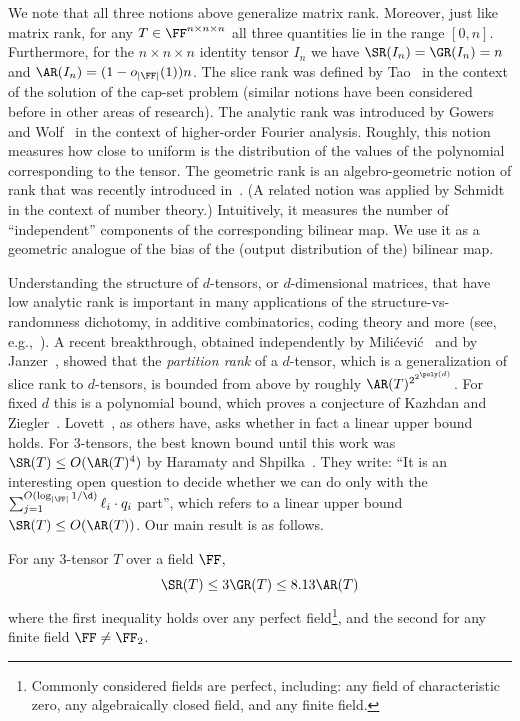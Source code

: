We note that all three notions above generalize matrix rank. Moreover, just like matrix rank, for any $T \in \FF^{n \times n \times n}$ all three quantities lie in the range $[0,n]$. Furthermore, for the $n \times n \times n$ identity tensor $I_n$ we have $\SR(I_n)=\GR(I_n)=n$ and $\AR(I_n)=(1-o_{|\FF|}(1))n$.
The slice rank was defined by Tao~\cite{Tao16} in the context of the solution of the cap-set problem (similar notions have been considered before in other areas of research). 
The analytic rank was introduced by Gowers and Wolf~\cite{GowersWo11} in the context of higher-order Fourier analysis.
Roughly, this notion measures how close to uniform is the distribution of the values of the polynomial corresponding to the tensor.
The geometric rank is an algebro-geometric notion of rank that was recently introduced in~\cite{KoppartyMoZu20}. 
(A related notion was applied by Schmidt~\cite{Schmidt85} in the context of number theory.)
Intuitively, it measures the number of ``independent'' components of the corresponding bilinear map.
We use it as a geometric analogue 
of the bias of the 
(output distribution of the) 
bilinear map.


Understanding the structure of $d$-tensors, or $d$-dimensional matrices, that have low analytic rank is important in many applications of the structure-vs-randomness dichotomy, in additive combinatorics, coding theory and more (see, e.g.,~\cite{BhowmickLo15,GreenTao09}).
A recent breakthrough, obtained independently by Mili\'{c}evi\'{c}~\cite{Milicevic19} and by Janzer~\cite{Janzer19}, showed that the \emph{partition rank} of a $d$-tensor, which is a generalization of slice rank to $d$-tensors, is bounded from above by roughly $\AR(T)^{2^{2^{\poly(d)}}}$. For fixed $d$ this is a polynomial bound, 
which proves a conjecture of Kazhdan and Ziegler~\cite{KazhdanZi20}. 
Lovett~\cite{Lovett19}, as others have, asks whether in fact a linear upper bound holds.
For $3$-tensors, the best known bound until this work was $\SR(T) \le O(\AR(T)^4)$ by Haramaty and Shpilka~\cite{HaramatySh10}.
They write: ``It is an interesting open question to
decide whether we can do only with the $\sum_{j=1}^{O(\log_{|\FF|}1/\d)} \ell_i \cdot q_i$ part'', which refers to a linear upper bound $\SR(T) \le O(\AR(T))$.
Our main result is as follows.
\begin{main}\label{main:summary}
	For any $3$-tensor $T$ over a field $\FF$, 
	$$\SR(T) \le 3\GR(T) \le 8.13\AR(T) $$
	where the first inequality holds over any perfect field\footnote{Commonly considered fields are perfect, including: any field of characteristic zero, any algebraically closed field, and any finite field.}, and the second for any finite field $\FF \neq \FF_2$.
\end{main}
